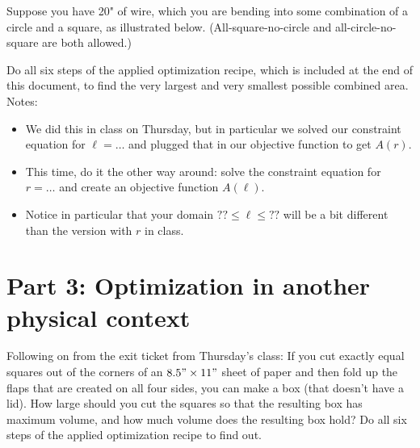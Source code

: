Suppose you have 20" of wire, which you are bending into some combination of a circle and a square, as illustrated below. (All-square-no-circle and all-circle-no-square are both allowed.)

\vspace{0.5em}

\begin{minipage}{0.3 \textwidth}
\end{minipage} %
\hfill
\begin{minipage}{0.65 \textwidth}
    Do all six steps of the applied optimization recipe, which is included at the end of this document, to find the very largest and very smallest possible combined area. Notes:

    \begin{itemize}[leftmargin=15pt]
        \item We did this in class on Thursday, but in particular we solved our constraint equation for $\ell = \ldots$ and plugged that in our objective function to get $A(r)$.
        \item This time, do it the other way around: solve the constraint equation for $r = \ldots$ and create an objective function $A(\ell)$.
        \item Notice in particular that your domain $?? \leq \ell \leq ??$ will be a bit different than the version with $r$ in class.
    \end{itemize}
\end{minipage}


\section{Part 3: Optimization in another physical context}

Following on from the exit ticket from Thursday's class: If you cut exactly equal squares out of the corners of an $8.5" \times 11"$ sheet of paper and then fold up the flaps that are created on all four sides, you can make a box (that doesn't have a lid). How large should you cut the squares so that the resulting box has maximum volume, and how much volume does the resulting box hold? Do all six steps of the applied optimization recipe to find out.

